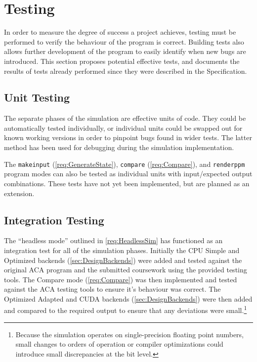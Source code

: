 
\chapter{Testing}
\label{sec:Testing} 
In order to measure the degree of success a project achieves, testing must be performed to verify the behaviour of the program is correct.
Building tests also allows further development of the program to easily identify when new bugs are introduced.
This section proposes potential effective tests, and documents the results of tests already performed since they were described in the Specification.


\section{Unit Testing}
The separate phases of the simulation are effective units of code.
They could be automatically tested individually, or individual units could be swapped out for known working versions in order to pinpoint bugs found in wider tests.
The latter method has been used for debugging during the simulation implementation.

The \texttt{makeinput} (\cref{req:GenerateState}), \texttt{compare} (\cref{req:Compare}), and \texttt{renderppm} program modes can also be tested as individual units with input/expected output combinations.
These tests have not yet been implemented, but are planned as an extension.\label{sec:TestsForSubcommands}

\section{Integration Testing}
The ``headless mode'' outlined in \cref{req:HeadlessSim} has functioned as an integration test for all of the simulation phases.
Initially the CPU Simple and Optimized backends (\cref{sec:DesignBackends}) were added and tested against the original ACA program\cite{modules:CS257Coursework} and the submitted coursework\cite{modules:aca257submission} using the provided testing tools.
The Compare mode (\cref{req:Compare}) was then implemented and tested against the ACA testing tools to ensure it's behaviour was correct.
The Optimized Adapted and CUDA backends (\cref{sec:DesignBackends}) were then added and compared to the required output to ensure that any deviations were small.\footnote{Because the simulation operates on single-precision floating point numbers, small changes to orders of operation or compiler optimizations could introduce small discrepancies at the bit level.}


